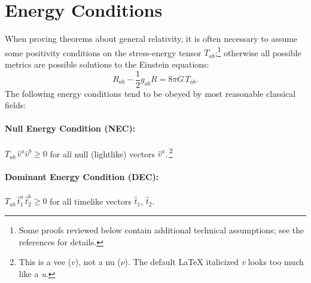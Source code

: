 \documentclass[12pt]{article}
\def\be{\begin{equation}}
\def\ee{\end{equation}}
\begin{document}
\section{Energy Conditions} \label{sec:energy}

When proving theorems about general relativity, it is often necessary to assume some positivity conditions on the stress-energy tensor $T_{ab}$;\footnote{Some proofs reviewed below contain additional technical assumptions; see the references for details.} otherwise all possible metrics are possible solutions to the Einstein equations:
\be
R_{ab} - \frac{1}{2}g_{ab}R = 8\pi G\,T_{ab}.
\ee  
The following energy conditions tend to be obeyed by most reasonable classical fields: 

\paragraph{Null Energy Condition (NEC):} $T_{ab} \,\hat{v}^a \hat{v}^b \geq 0$ for all null (lightlike) vectors $\hat{v}^a$.\,\footnote{This is a vee ($v$), not a nu ($\nu$).  The default LaTeX italicized \textit{v} looks too much like a \textit{u}.}



\paragraph{Dominant Energy Condition (DEC):} $T_{ab} \,\hat{t}_1^a \,\hat{t}_2^b \geq 0$ for all timelike vectors $\hat{t}_1$, $\hat{t}_2$. \newline
\end{document}
